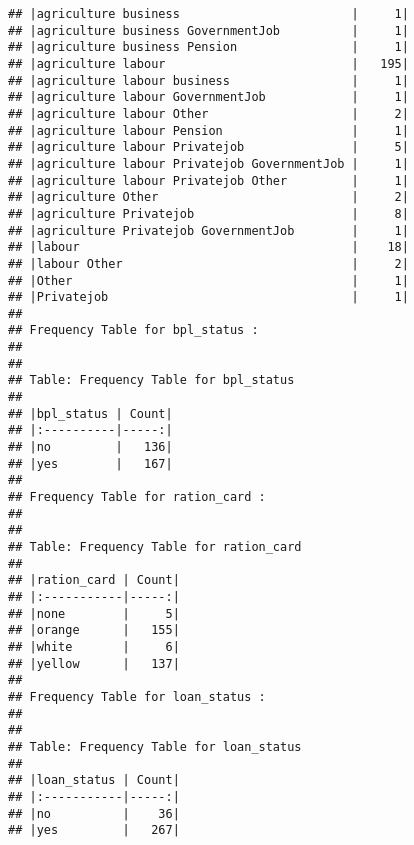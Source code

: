 \documentclass[
]{article}
\begin{document}
\begin{verbatim}
## |agriculture business                        |     1|
## |agriculture business GovernmentJob          |     1|
## |agriculture business Pension                |     1|
## |agriculture labour                          |   195|
## |agriculture labour business                 |     1|
## |agriculture labour GovernmentJob            |     1|
## |agriculture labour Other                    |     2|
## |agriculture labour Pension                  |     1|
## |agriculture labour Privatejob               |     5|
## |agriculture labour Privatejob GovernmentJob |     1|
## |agriculture labour Privatejob Other         |     1|
## |agriculture Other                           |     2|
## |agriculture Privatejob                      |     8|
## |agriculture Privatejob GovernmentJob        |     1|
## |labour                                      |    18|
## |labour Other                                |     2|
## |Other                                       |     1|
## |Privatejob                                  |     1|
## 
## Frequency Table for bpl_status :
## 
## 
## Table: Frequency Table for bpl_status
## 
## |bpl_status | Count|
## |:----------|-----:|
## |no         |   136|
## |yes        |   167|
## 
## Frequency Table for ration_card :
## 
## 
## Table: Frequency Table for ration_card
## 
## |ration_card | Count|
## |:-----------|-----:|
## |none        |     5|
## |orange      |   155|
## |white       |     6|
## |yellow      |   137|
## 
## Frequency Table for loan_status :
## 
## 
## Table: Frequency Table for loan_status
## 
## |loan_status | Count|
## |:-----------|-----:|
## |no          |    36|
## |yes         |   267|
\end{verbatim}
\end{document}
